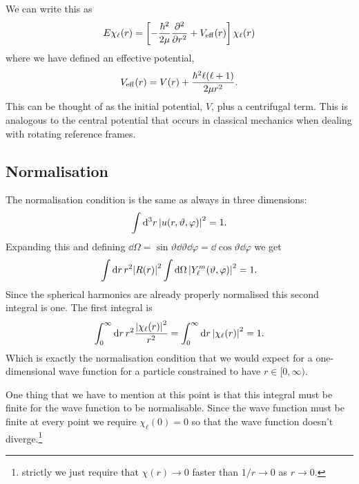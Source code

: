 We can write this as
\begin{equation}\label{eqn:central potential radial SE}
    E\chi_\ell(r) = \left[-\frac{\hbar^2}{2\mu}\pdv[2]{r} + V_{\mathrm{eff}}(r)\right]\chi_\ell(r)
\end{equation}
where we have defined an effective potential,
\[V_{{\mathrm{eff}}}(r) = V(r) + \frac{\hbar^2\ell(\ell + 1)}{2\mu r^2}.\]
This can be thought of as the initial potential, \(V\), plus a centrifugal term.
This is analogous to the central potential that occurs in classical mechanics when dealing with rotating reference frames.

\subsection{Normalisation}
The normalisation condition is the same as always in three dimensions:
\[\int\dd[3]{r} \abs{u(r, \vartheta, \varphi)}^2 = 1.\]
Expanding this and defining \(\dd{\Omega} = \sin\vartheta\dd{\vartheta}\dd{\varphi} = \dd{\cos\vartheta}\dd{\varphi}\) we get
\[\int\dd{r}r^2\abs{R(r)}^2\int \dd{\Omega}\abs{Y_\ell^m(\vartheta, \varphi)}^2 = 1.\]
Since the spherical harmonics are already properly normalised this second integral is one.
The first integral is
\[\int_0^{\infty}\dd{r}r^2\frac{\abs{\chi_\ell(r)}^2}{r^2} = \int_0^\infty\dd{r}\abs{\chi_\ell(r)}^2 = 1.\]
Which is exactly the normalisation condition that we would expect for a one-dimensional wave function for a particle constrained to have \(r\in[0, \infty)\).

One thing that we have to mention at this point is that this integral must be finite for the wave function to be normalisable.
Since the wave function must be finite at every point we require \(\chi_\ell(0) = 0\) so that the wave function doesn't diverge.\footnote{strictly we just require that \(\chi(r)\to 0\) faster than \(1/r\to 0\) as \(r\to 0\).}

